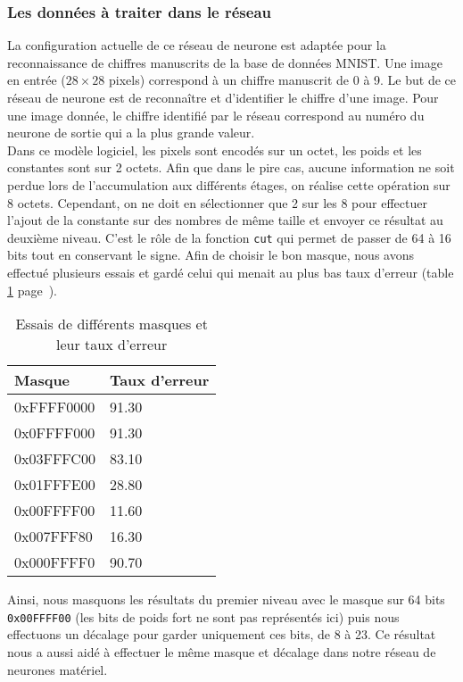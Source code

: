 \subsubsection{Les données à traiter dans le réseau}

La configuration actuelle de ce réseau de neurone est adaptée pour la
reconnaissance de chiffres manuscrits de la base de données MNIST. Une image
en entrée ($28 \times 28$ pixels) correspond à un chiffre manuscrit de 0 à 9.
Le but de ce réseau de neurone est de reconnaître et d'identifier le chiffre
d'une image. Pour une image donnée, le chiffre identifié par le réseau correspond
au numéro du neurone de sortie qui a la plus grande valeur. \\
Dans ce modèle logiciel, les pixels sont encodés sur un octet, les poids et les
constantes sont sur 2 octets. Afin que dans le pire cas, aucune information ne
soit perdue lors de l'accumulation aux différents étages, on réalise cette opération sur
8 octets. Cependant, on ne doit en sélectionner que 2 sur les 8 pour effectuer l'ajout de la constante
sur des nombres de même taille et envoyer ce résultat au deuxième niveau. C'est
le rôle de la fonction \texttt{cut} qui permet de passer de 64 à 16 bits tout
en conservant le signe. Afin de choisir le bon masque, nous avons effectué
plusieurs essais et gardé celui qui menait au plus bas taux d'erreur (table
\ref{fig:masques} page~\pageref{fig:masques}).

\begin{table}[h!]
\centering
	\begin{tabular}{| l | l |}
	\hline
	Masque & Taux d'erreur \\ \hline
	0xFFFF0000 & 91.30 \\ \hline
	0x0FFFF000 & 91.30 \\ \hline
	0x03FFFC00 & 83.10 \\ \hline
	0x01FFFE00 & 28.80 \\ \hline
	0x00FFFF00 & 11.60 \\ \hline
	0x007FFF80 & 16.30 \\ \hline
	0x000FFFF0 & 90.70 \\ \hline
	\end{tabular}
	\caption{Essais de différents masques et leur taux d'erreur}
	\label{fig:masques}
\end{table}

Ainsi, nous masquons les résultats du premier niveau avec le masque sur 64 bits
\texttt{0x00FFFF00} (les bits de poids fort ne sont pas représentés ici) puis
nous effectuons un décalage pour garder uniquement ces bits, de 8 à 23. Ce
résultat nous a aussi aidé à effectuer le même masque et décalage dans notre
réseau de neurones matériel.

